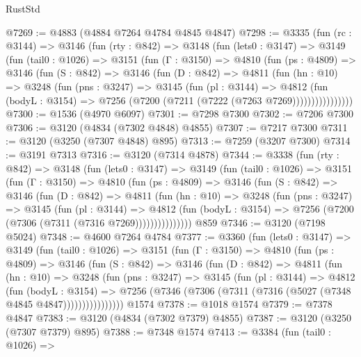 \begin{lexlean}{RustStd}
\begin{coremodule}
{\begin{coremodule}
{{{{{{{{{{{{{{{{{{{{{{{{{{@7269 := @4883 (@4884 @7264 @4784 @4845 @4847)
@7298 := @3335
    (fun (rc : @3144) =>
    @3146
      (fun (rty : @842) =>
      @3148
        (fun (lets0 : @3147) =>
        @3149
          (fun (tail0 : @1026) =>
          @3151
            (fun (Γ : @3150) =>
            @4810
              (fun (ps : @4809) =>
              @3146
                (fun (S : @842) =>
                @3146
                  (fun (D : @842) =>
                  @4811
                    (fun (hn : @10) =>
                    @3248
                      (fun (pns : @3247) =>
                      @3145
                        (fun (pl : @3144) =>
                        @4812
                          (fun (bodyL : @3154) =>
                          @7256 (@7200 (@7211 (@7222 (@7263 @7269))))))))))))))))
@7300 := @1536 (@4970 @6097)
@7301 := @7298 @7300
@7302 := @7206 @7300
@7306 := @3120 (@4834 (@7302 @4848) @4855)
@7307 := @7217 @7300
@7311 := @3120 (@3250 (@7307 @4848) @895)
@7313 := @7259 (@3207 @7300)
@7314 := @3191 @7313
@7316 := @3120 (@7314 @4878)
@7344 := @3338
    (fun (rty : @842) =>
    @3148
      (fun (lets0 : @3147) =>
      @3149
        (fun (tail0 : @1026) =>
        @3151
          (fun (Γ : @3150) =>
          @4810
            (fun (ps : @4809) =>
            @3146
              (fun (S : @842) =>
              @3146
                (fun (D : @842) =>
                @4811
                  (fun (hn : @10) =>
                  @3248
                    (fun (pns : @3247) =>
                    @3145
                      (fun (pl : @3144) =>
                      @4812
                        (fun (bodyL : @3154) =>
                        @7256 (@7200 (@7306 (@7311 (@7316 @7269)))))))))))))))
    @859
@7346 := @3120 (@7198 @5024)
@7348 := @4600 @7264 @4784
@7377 := @3360
    (fun (lets0 : @3147) =>
    @3149
      (fun (tail0 : @1026) =>
      @3151
        (fun (Γ : @3150) =>
        @4810
          (fun (ps : @4809) =>
          @3146
            (fun (S : @842) =>
            @3146
              (fun (D : @842) =>
              @4811
                (fun (hn : @10) =>
                @3248
                  (fun (pns : @3247) =>
                  @3145
                    (fun (pl : @3144) =>
                    @4812
                      (fun (bodyL : @3154) =>
                      @7256 (@7346 (@7306 (@7311 (@7316 (@5027 (@7348 @4845 @4847))))))))))))))))
    @1574
@7378 := @1018 @1574
@7379 := @7378 @4847
@7383 := @3120 (@4834 (@7302 @7379) @4855)
@7387 := @3120 (@3250 (@7307 @7379) @895)
@7388 := @7348 @1574
@7413 := @3384
    (fun (tail0 : @1026) =>
}}}}}}}}}}}}}}}}}}}}}}}}}}
\end{coremodule}}
\end{coremodule}
\end{lexlean}
